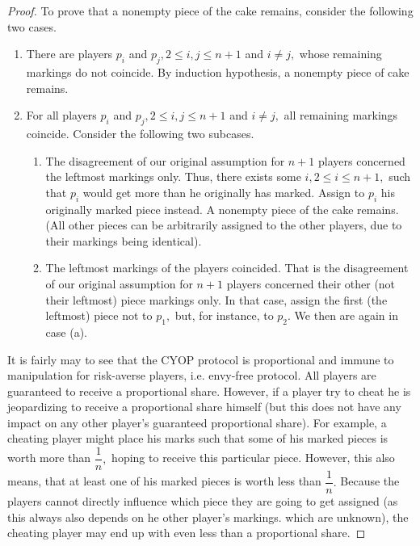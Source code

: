 \documentclass[a4paper, 12pt]{article}
\begin{document}
\begin{proof}
To prove that a nonempty piece of the cake remains, consider the following two cases.
\begin{enumerate}
	\item There are players $p_i$ and $p_j, 2 \leqslant i, j \leqslant n + 1$ and $i \neq j,$ whose remaining markings do not coincide. By induction hypothesis, a nonempty piece of cake remains. 
	\item For all players $p_i$ and $p_j, 2 \leqslant i, j \leqslant n + 1$ and $i \neq j,$ all remaining markings coincide. Consider the following two subcases.
\begin{enumerate}
	\item The disagreement of our original assumption for $n+1$ players concerned the leftmost markings only. Thus, there exists some $i, 2 \leqslant i \leqslant n + 1,$ such that $p_i$ would get more than he originally has marked. Assign to $p_i$  his originally marked piece instead. A nonempty piece of the cake remains. (All other pieces can be arbitrarily assigned to the other players, due to their markings being identical).
	\item The leftmost markings of the players coincided. That is the disagreement of our original assumption for $n+1$ players concerned their other (not their leftmost) piece markings only. In that case, assign the first (the leftmost) piece not to $p_1,$  but, for instance,  to $p_2.$ We then are again in case (a).
\end{enumerate}
\end{enumerate}
It is fairly may to see that the CYOP protocol is proportional and immune to manipulation for risk-averse players, i.e. envy-free protocol. All players are guaranteed to receive a proportional share. However, if a player try to cheat he is jeopardizing to receive a proportional share himself (but this does not have any impact on any other player's guaranteed proportional share). For example, a cheating player might place his marks such that some of his marked pieces is worth more than $\dfrac{1}{n},$ hoping to receive this particular piece. However, this also means, that at least one of his marked pieces is worth less than $\dfrac{1}{n}.$ Because the players cannot directly influence which piece they are going to get assigned (as this always also depends on he other player's markings. which are unknown), the cheating player may end up with even less than a proportional share.    
 
\end{proof}
\end{document}
